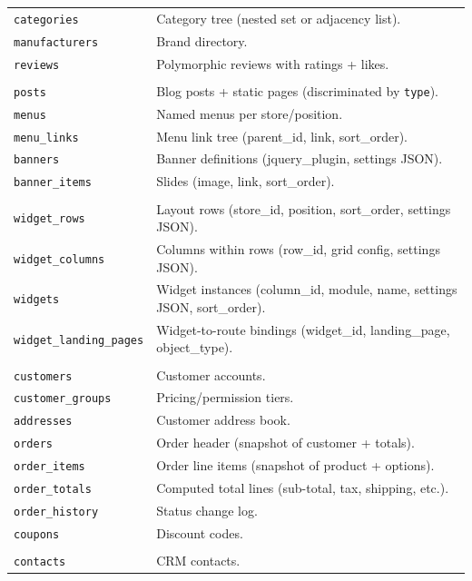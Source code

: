 \documentclass[11pt,a4paper]{article}
\begin{document}
\begin{longtable}{>{\raggedright\arraybackslash}p{4.0cm}l}
\texttt{categories} & Category tree (nested set or adjacency list). \\
\texttt{manufacturers} & Brand directory. \\
\texttt{reviews} & Polymorphic reviews with ratings + likes. \\
\midrule
\multicolumn{2}{l}{\textbf{CMS}} \\
\texttt{posts} & Blog posts + static pages (discriminated by \texttt{type}). \\
\texttt{menus} & Named menus per store/position. \\
\texttt{menu\_links} & Menu link tree (parent\_id, link, sort\_order). \\
\texttt{banners} & Banner definitions (jquery\_plugin, settings JSON). \\
\texttt{banner\_items} & Slides (image, link, sort\_order). \\
\midrule
\multicolumn{2}{l}{\textbf{Widget engine}} \\
\texttt{widget\_rows} & Layout rows (store\_id, position, sort\_order, settings JSON). \\
\texttt{widget\_columns} & Columns within rows (row\_id, grid config, settings JSON). \\
\texttt{widgets} & Widget instances (column\_id, module, name, settings JSON, sort\_order). \\
\texttt{widget\_landing\_pages} & Widget-to-route bindings (widget\_id, landing\_page, object\_type). \\
\midrule
\multicolumn{2}{l}{\textbf{Commerce}} \\
\texttt{customers} & Customer accounts. \\
\texttt{customer\_groups} & Pricing/permission tiers. \\
\texttt{addresses} & Customer address book. \\
\texttt{orders} & Order header (snapshot of customer + totals). \\
\texttt{order\_items} & Order line items (snapshot of product + options). \\
\texttt{order\_totals} & Computed total lines (sub-total, tax, shipping, etc.). \\
\texttt{order\_history} & Status change log. \\
\texttt{coupons} & Discount codes. \\
\midrule
\multicolumn{2}{l}{\textbf{Marketing}} \\
\texttt{contacts} & CRM contacts. \\

\end{longtable}
\end{document}
